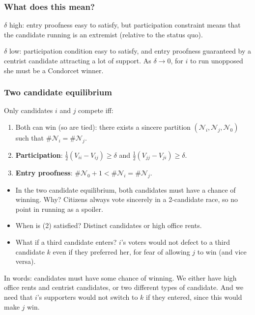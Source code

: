 \documentclass[11pt,aspectratio=169]{beamer}
\begin{document}
\begin{frame}
\frametitle{What does this mean?}

$\delta$ high: entry proofness easy to satisfy, but participation constraint means that the candidate running is an extremist (relative to the status quo). 

\bigskip
\pause 

$\delta$ low: participation condition easy to satisfy, and entry proofness guaranteed by a centrist candidate attracting a lot of support. As $\delta\rightarrow 0$, for $i$ to run unopposed she must be a Condorcet winner. 

\end{frame}



\begin{frame}
\frametitle{Two candidate equilibrium}

Only candidates $i$ and $j$ compete iff: \begin{enumerate}
\item Both can win (so are tied): there exists a sincere partition $(\mathcal{N}_i,\mathcal{N}_j,\mathcal{N}_0)$ such that $\#\mathcal{N}_i = \#\mathcal{N}_j$.
\item \textbf{Participation}: $\frac{1}{2}(V_{ii}-V_{ij}) \geq \delta$ and $\frac{1}{2} (V_{jj}-V_{ji}) \geq \delta$.
\item \textbf{Entry proofness}: $\#\mathcal{N}_0 +1 < \#\mathcal{N}_i=\#\mathcal{N}_j$.
\end{enumerate}

\bigskip

\begin{itemize}
\item In the two candidate equilibrium, both candidates must have a chance of winning. \alert{Why?} \pause Citizens always vote sincerely in a 2-candidate race, so no point in running as a spoiler. \pause 
\item When is \alert{(2)} satisfied? \pause Distinct candidates or high office rents. \pause
\item What if a \alert{third candidate} enters? \pause $i$'s voters would not defect to a third candidate $k$ even if they preferred her, for fear of allowing $j$ to win (and vice versa).

\end{itemize}

In words: candidates must have some chance of winning. We either have high office rents and centrist candidates, or two different types of candidate. And we need that $i$'s supporters would not switch to $k$ if they entered, since this would make $j$ win.

\end{frame}
\end{document}
